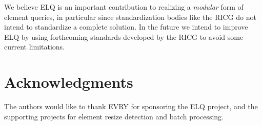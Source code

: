 \documentclass{acm_proc_article-sp}
\newcommand{\elq}{ELQ}
\begin{document}
  We believe \elq{} is an important contribution to realizing a \emph{modular} form of element queries, in particular since standardization bodies like the RICG do not intend to standardize a complete solution.
  In the future we intend to improve \elq{} by using forthcoming standards developed by the RICG to avoid some current limitations.


\section{Acknowledgments}
The authors would like to thank EVRY for sponsoring the \elq{} project, and the supporting projects for element resize detection and batch processing.

%

%
%
\end{document}
